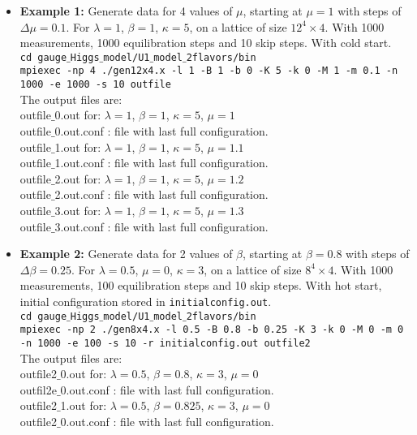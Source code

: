 \documentclass[a4paper,10pt]{report}
\begin{document}
\begin{itemize}[leftmargin=*]
\begin{itemize}[leftmargin=*]
  \vspace*{4mm}
  \item {\bf Example 1:} Generate data for 4 values of $\mu$, starting at $\mu = 1$ with steps of $\Delta\mu=0.1$. 
  For $\lambda =1$, $\beta=1$, $\kappa=5$, on a lattice of size $12^4\times4$.  With 1000 measurements, 1000 equilibration
  steps and 10 skip steps.  With cold start.
  \vspace*{2mm}
  \texttt{
  \\cd gauge$\_$Higgs$\_$model/U1$\_$model$\_$2flavors/bin
  \\mpiexec -np 4 ./gen12x4.x -l 1 -B 1 -b 0 -K 5 -k 0 -M 1 -m 0.1 -n 1000 -e 1000 -s 10 outfile
  }
  \vspace*{2mm}
  \\The output files are:  
  \\outfile$\_$0.out for: $\lambda =1$, $\beta=1$, $\kappa=5$, $\mu = 1$
  \\outfile$\_$0.out.conf : file with last full configuration.
  \\outfile$\_$1.out for: $\lambda =1$, $\beta=1$, $\kappa=5$, $\mu = 1.1$
  \\outfile$\_$1.out.conf : file with last full configuration.
  \\outfile$\_$2.out for: $\lambda =1$, $\beta=1$, $\kappa=5$, $\mu = 1.2$
  \\outfile$\_$2.out.conf : file with last full configuration.
  \\outfile$\_$3.out for: $\lambda =1$, $\beta=1$, $\kappa=5$, $\mu = 1.3$
  \\outfile$\_$3.out.conf : file with last full configuration.
 
 \vspace*{4mm}
  \item {\bf Example 2:} Generate data for 2 values of $\beta$, starting at $\beta = 0.8$ with steps of $\Delta\beta=0.25$. 
  For $\lambda =0.5$, $\mu=0$, $\kappa=3$, on a lattice of size $8^4\times4$.  With 1000 measurements, 100 equilibration
  steps and 10 skip steps.  With hot start, initial configuration stored in {\tt initialconfig.out}.
  \vspace*{2mm}
  \texttt{
  \\cd gauge$\_$Higgs$\_$model/U1$\_$model$\_$2flavors/bin
  \\mpiexec -np 2 ./gen8x4.x -l 0.5 -B 0.8 -b 0.25 -K 3 -k 0 -M 0 -m 0 -n 1000 -e 100 -s 10 -r initialconfig.out outfile2
  }
  \\The output files are:  
  \\outfile2$\_$0.out for: $\lambda =0.5$, $\beta=0.8$, $\kappa=3$, $\mu = 0$
  \\outfil2e$\_$0.out.conf : file with last full configuration.
  \\outfile2$\_$1.out for: $\lambda =0.5$, $\beta=0.825$, $\kappa=3$, $\mu = 0$
  \\outfile2$\_$0.out.conf : file with last full configuration.
 \end{itemize}


\end{itemize}
\end{document}

